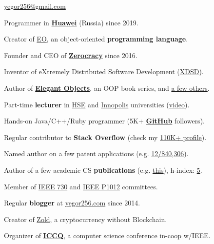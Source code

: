 \documentclass{yb}
\begin{document}
\sffamily

\ybPrintPhoto{}

{\scshape\bfseries\Large {}}\newline
\href{mailto:yegor256@gmail.com}{yegor256@gmail.com}

\vspace{1em}

Programmer in \textbf{\href{https://www.huawei.com}{Huawei}} (Russia) since 2019.

Creator of \href{https://www.eolang.org}{EO}, an object-oriented \textbf{programming language}.

Founder and CEO of \textbf{\href{https://www.zerocracy.com}{Zerocracy}} since 2016.

Inventor of eXtremely Distributed Software Development (\href{https://www.xdsd.org}{XDSD}).

Author of \textbf{\href{https://www.yegor256.com/elegant-objects.html}{Elegant Objects}},
  an OOP book series, and \href{https://www.yegor256.com/books.html}{a few others}.

Part-time \textbf{lecturer} in \href{https://www.hse.ru/en/}{HSE}
  and \href{https://innopolis.university/en/}{Innopolis} universities
  (\href{https://www.youtube.com/playlist?list=PLaIsQH4uc08y14wCJMeffS2yErN4QpB8m}{video}).

Hands-on Java/C++/Ruby programmer
  (5K+ \textbf{\href{https://github.com/yegor256}{GitHub}} followers).

Regular contributor to \textbf{Stack Overflow}
  (check my \href{https://stackexchange.com/users/63162/yegor256}{110K+ profile}).

Named author on a few patent applications
  (e.g. \href{https://www.google.com/patents/US20120023476}{12/840,306}).

Author of a few academic CS \textbf{publications}
  (e.g. \href{https://link.springer.com/chapter/10.1007/978-3-642-02152-7_6}{this}),
  h-index: \href{https://scholar.google.com/citations?user=cYmXh60AAAAJ}{5}.

Member of \href{http://standards.ieee.org/develop/wg/730.html}{IEEE 730} and
  \href{https://standards.ieee.org/ieee/1012/7324/}{IEEE P1012} committees.

Regular \textbf{blogger} at \href{https://www.yegor256.com/}{yegor256.com} since 2014.

Creator of \href{https://www.zold.io}{Zold}, a cryptocurrency without Blockchain.

Organizer of \href{https://www.iccq.ru}{\textbf{ICCQ}},
  a computer science conference in-coop w/IEEE.
\end{document}
